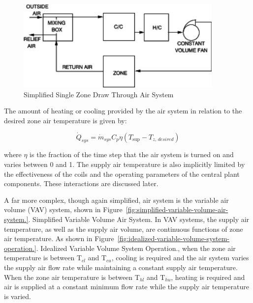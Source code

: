 \begin{figure}[hbtp] %
\centering
\includegraphics[width=0.9\textwidth, height=0.9\textheight, keepaspectratio=true]{media/image31.svg.png}
\caption{Simplified Single Zone Draw Through Air System \protect \label{fig:simplified-single-zone-draw-through-air}}
\end{figure}

The amount of heating or cooling provided by the air system in relation to the desired zone air temperature is given by:

\begin{equation}
{\dot Q_{sys}} = {\dot m_{sys}}{C_p}\eta \left( {{T_{\sup }} - {T_{z,\,desired}}} \right)
\end{equation}

where $\eta$ is the fraction of the time step that the air system is turned on and varies between 0 and 1. The supply air temperature is also implicitly limited by the effectiveness of the coils and the operating parameters of the central plant components. These interactions are discussed later.

A far more complex, though again simplified, air system is the variable air volume (VAV) system, shown in Figure~\ref{fig:simplified-variable-volume-air-system.}. Simplified Variable Volume Air System. In VAV systems, the supply air temperature, as well as the supply air volume, are continuous functions of zone air temperature. As shown in Figure~\ref{fig:idealized-variable-volume-system-operation.}. Idealized Variable Volume System Operation., when the zone air temperature is between T\(_{cl}\) and T\(_{cu}\), cooling is required and the air system varies the supply air flow rate while maintaining a constant supply air temperature. When the zone air temperature is between T\(_{hl}\) and T\(_{hu}\), heating is required and air is supplied at a constant minimum flow rate while the supply air temperature is varied.

